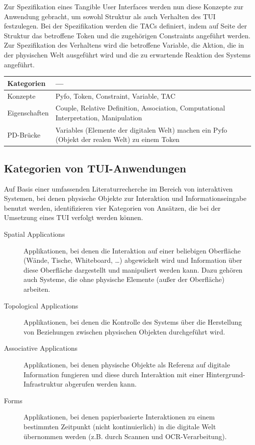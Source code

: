 Zur Spezifikation eines Tangible User Interfaces werden nun diese Konzepte zur Anwendung gebracht, um sowohl Struktur als auch Verhalten des \gls{TUI} festzulegen. Bei der Spezifikation werden die \glspl{TAC} definiert, indem auf Seite der Struktur das betroffene Token und die zugehörigen Constraints angeführt werden. Zur Spezifikation des Verhaltens wird die betroffene Variable, die Aktion, die in der physischen Welt ausgeführt wird und die zu erwartende Reaktion des Systems angeführt.
\\[1em]
\begin{tabular}{| p{3cm} | p{10cm} |}
  \hline
  Kategorien & --- \\ \hline
  Konzepte & Pyfo, Token, Constraint, Variable, \gls{TAC} \\ \hline
  Eigenschaften & Couple, Relative Definition, Association, Computational Interpretation, Manipulation \\ \hline
  PD-Brücke & Variables (Elemente der digitalen Welt) machen ein Pyfo (Objekt der realen Welt) zu einem Token \\ \hline
\end{tabular} 


\subsection{Kategorien von TUI-Anwendungen} %
\label{sub:kategorien_von_tui_anwendungen}

Auf Basis einer umfassenden Literaturrecherche im Bereich von interaktiven Systemen, bei denen physische Objekte zur Interaktion und Informationseingabe benutzt werden, identifizieren \citet{Klemmer04} vier Kategorien von Ansätzen, die bei der Umsetzung eines \gls{TUI} verfolgt werden können. 

\begin{description}
	\item[Spatial Applications] Applikationen, bei denen die Interaktion auf einer beliebigen Oberfläche (Wände, Tische, Whiteboard, \ldots) abgewickelt wird und Information über diese Oberfläche dargestellt und manipuliert werden kann. Dazu gehören auch Systeme, die ohne physische Elemente (außer der Oberfläche) arbeiten.
	\item[Topological Applications] Applikationen, bei denen die Kontrolle des Systems über die Herstellung von Beziehungen zwischen physischen Objekten durchgeführt wird.
	\item[Associative Applications] Applikationen, bei denen physische Objekte als Referenz auf digitale Information fungieren und diese durch Interaktion mit einer Hintergrund-Infrastruktur abgerufen werden kann.
	\item[Forms] Applikationen, bei denen papierbasierte Interaktionen zu einem bestimmten Zeitpunkt (nicht kontinuierlich) in die digitale Welt übernommen werden (z.B. durch Scannen und \gls{OCR}-Verarbeitung).
\end{description}

